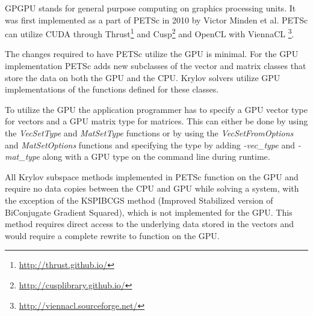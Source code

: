 GPGPU stands for general purpose computing on graphics processing units. It was 
first implemented as a part of PETSc in 2010\cite{minden2010preliminary} by Victor 
Minden et al. PETSc can utilize CUDA through Thrust\footnote{\url{http://thrust.github.io/}} 
and Cusp\footnote{\url{http://cusplibrary.github.io/}} and OpenCL with ViennaCL
\footnote{\url{http://viennacl.sourceforge.net/}}. 

The changes required to have PETSc utilize the GPU is minimal. For the GPU 
implementation PETSc adds new subclasses of the vector and matrix classes that 
store the data on both the GPU and the CPU. Krylov solvers utilize GPU implementations 
of the functions defined for these classes.

To utilize the GPU the application programmer has to specify a GPU vector type 
for vectors and a GPU matrix type for matrices. This can either be done by using 
the \emph{VecSetType} and \emph{MatSetType} functions or by using the \emph{VecSetFromOptions}
and \emph{MatSetOptions} functions and specifying the type by adding \emph{-vec\_type} and 
\emph{-mat\_type} along with a GPU type on the command line during runtime. 

All Krylov subspace methods implemented in PETSc function on the GPU and require 
no data copies between the CPU and GPU while solving a system, with the exception
of the KSPIBCGS method (Improved Stabilized version of BiConjugate Gradient Squared),
which is not implemented for the GPU. This method requires direct access to the 
underlying data stored in the vectors and would require a complete rewrite to 
function on the GPU.
